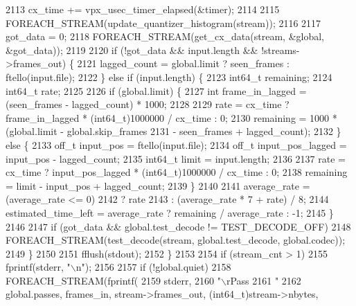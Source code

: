 \begin{DoxyCodeInclude}
{{{{{{{{{{{{{{{{{{{{{{{{{{{{{{{{{{{{{{{{{{{{{{{{{{{{{{{{{{{{{{{{{{2113         cx\_time += vpx\_usec\_timer\_elapsed(&timer);
2114 
2115         FOREACH\_STREAM(update\_quantizer\_histogram(stream));
2116 
2117         got\_data = 0;
2118         FOREACH\_STREAM(get\_cx\_data(stream, &global, &got\_data));
2119 
2120         \textcolor{keywordflow}{if} (!got\_data && input.length && !streams->frames\_out) \{
2121           lagged\_count = global.limit ? seen\_frames : ftello(input.file);
2122         \} \textcolor{keywordflow}{else} \textcolor{keywordflow}{if} (input.length) \{
2123           int64\_t remaining;
2124           int64\_t rate;
2125 
2126           \textcolor{keywordflow}{if} (global.limit) \{
2127             \textcolor{keywordtype}{int} frame\_in\_lagged = (seen\_frames - lagged\_count) * 1000;
2128 
2129             rate = cx\_time ? frame\_in\_lagged * (int64\_t)1000000 / cx\_time : 0;
2130             remaining = 1000 * (global.limit - global.skip\_frames
2131                                 - seen\_frames + lagged\_count);
2132           \} \textcolor{keywordflow}{else} \{
2133             off\_t input\_pos = ftello(input.file);
2134             off\_t input\_pos\_lagged = input\_pos - lagged\_count;
2135             int64\_t limit = input.length;
2136 
2137             rate = cx\_time ? input\_pos\_lagged * (int64\_t)1000000 / cx\_time : 0;
2138             remaining = limit - input\_pos + lagged\_count;
2139           \}
2140 
2141           average\_rate = (average\_rate <= 0)
2142               ? rate
2143               : (average\_rate * 7 + rate) / 8;
2144           estimated\_time\_left = average\_rate ? remaining / average\_rate : -1;
2145         \}
2146 
2147         \textcolor{keywordflow}{if} (got\_data && global.test\_decode != TEST\_DECODE\_OFF)
2148           FOREACH\_STREAM(test\_decode(stream, global.test\_decode, global.codec));
2149       \}
2150 
2151       fflush(stdout);
2152     \}
2153 
2154     \textcolor{keywordflow}{if} (stream\_cnt > 1)
2155       fprintf(stderr, \textcolor{stringliteral}{"\(\backslash\)n"});
2156 
2157     \textcolor{keywordflow}{if} (!global.quiet)
2158       FOREACH\_STREAM(fprintf(
2159                        stderr,
2160                        \textcolor{stringliteral}{"\(\backslash\)rPass %
2161                        \textcolor{stringliteral}{" %
2162                        global.passes, frames\_in, stream->frames\_out, (int64\_t)stream->nbytes,
}}}}}}}}}}}}}}}}}}}}}}}}}}}}}}}}}}}}}}}}}}}}}}}}}}}}}}}}}}}}}}}}}}}}
\end{DoxyCodeInclude}
